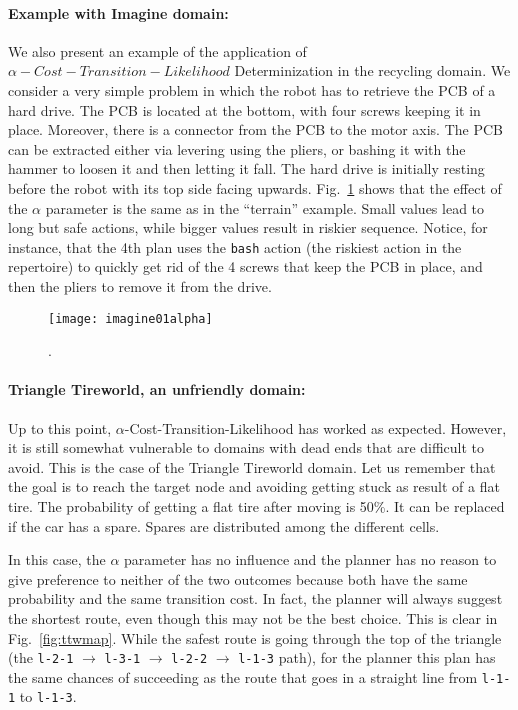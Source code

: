 \documentclass[../root.tex]{subfiles}
\begin{document}
\paragraph{Example with Imagine domain:} We also present an example
of the application of $\alpha-Cost-Transition-Likelihood$ Determinization
in the recycling domain. We consider a very simple problem in which the robot
has to retrieve the PCB of a hard drive. The PCB is located at the bottom,
with four screws keeping it in place. Moreover, there is a connector from
the PCB to the motor axis. The PCB can be extracted either via levering
using the pliers, or bashing it with the hammer to loosen it and then letting
it fall. The hard drive is initially resting before the robot with its top
side facing upwards. Fig.~\ref{fig:imagine01alpha} shows that the effect
of the $\alpha$ parameter is the same as in the ``terrain'' example. Small
values lead to long but safe actions, while bigger values result in riskier
sequence. Notice, for instance, that the 4th plan uses the \texttt{bash} action
(the riskiest action in the repertoire) to quickly get rid of the 4 screws
that keep the PCB in place, and then the pliers to remove it from the drive.

\begin{figure}[p]
	\centering
	\texttt{[image: imagine01alpha]}
	\caption{}
	\label{fig:imagine01alpha}. 
\end{figure}

\paragraph{Triangle Tireworld, an unfriendly domain:} Up to this point,
$\alpha$-Cost-Transition-Likelihood has worked as expected. However, it is
still somewhat vulnerable to domains with dead ends that are difficult to
avoid. This is the case of the Triangle Tireworld domain. Let us remember that
the goal is to reach the target node and avoiding getting stuck as result
of a flat tire. The probability of
getting a flat tire after moving is 50\%. It can be replaced if the car has
a spare. Spares are distributed among the different cells.

In this case, the $\alpha$ parameter has no influence and the planner
has no reason
to give preference to neither of the two outcomes because both have the
same probability and the same transition cost. In fact, the planner
will always suggest the shortest route, even
though this may not be the best choice. This is clear in Fig.~\ref{fig:ttwmap}.
While the safest route is going through the top of the triangle (the
\texttt{l-2-1} $\rightarrow$ \texttt{l-3-1} $\rightarrow$ \texttt{l-2-2} $\rightarrow$
\texttt{l-1-3} path), for the planner this plan has the same chances of succeeding as
the route that goes in a straight line from \texttt{l-1-1} to \texttt{l-1-3}.
\end{document}
